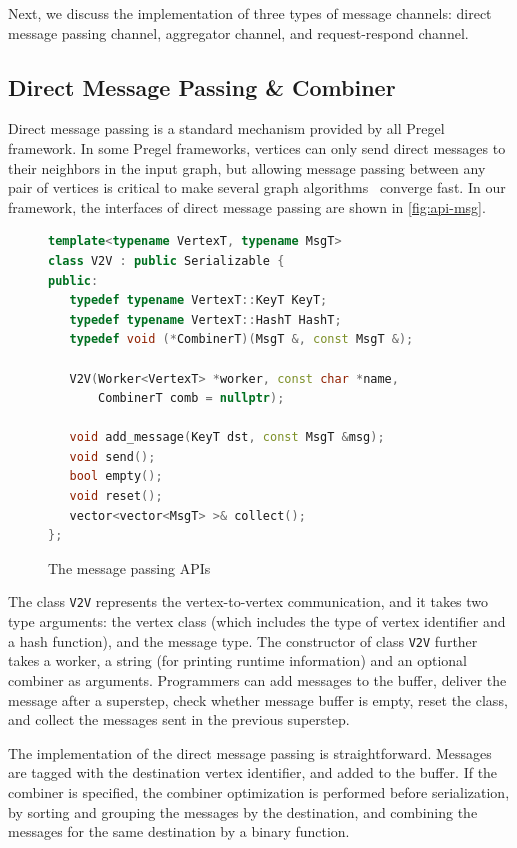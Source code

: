 \documentclass{sokendai_thesis} %
\begin{document}
Next, we discuss the implementation of three types of message channels: direct message passing channel, aggregator channel, and request-respond channel.

\subsection{Direct Message Passing \& Combiner}

Direct message passing is a standard mechanism provided by all Pregel framework.
In some Pregel frameworks, vertices can only send direct messages to their neighbors in the input graph, but allowing message passing between any pair of vertices is critical to make several graph algorithms~\cite{connectivity, effective} converge fast.
In our framework, the interfaces of direct message passing are shown in \autoref{fig:api-msg}.

\begin{figure}[ht]
\centering
\vspace{-2ex}
\begin{lstlisting}[basicstyle=\small\ttfamily,
numbers=none,language=c++,xleftmargin=0.1\textwidth]
template<typename VertexT, typename MsgT>
class V2V : public Serializable {
public:
   typedef typename VertexT::KeyT KeyT;
   typedef typename VertexT::HashT HashT;
   typedef void (*CombinerT)(MsgT &, const MsgT &);

   V2V(Worker<VertexT> *worker, const char *name,
       CombinerT comb = nullptr);

   void add_message(KeyT dst, const MsgT &msg);
   void send();
   bool empty();
   void reset();
   vector<vector<MsgT> >& collect();
};
\end{lstlisting}
\vspace{-2ex}
\caption{The message passing APIs}
\label{fig:api-msg}
\end{figure}

The class \texttt{V2V} represents the vertex-to-vertex communication, and it takes two type arguments: the vertex class (which includes the type of vertex identifier and a hash function), and the message type.
The constructor of class \texttt{V2V} further takes a worker, a string (for printing runtime information) and an optional combiner as arguments.
Programmers can add messages to the buffer, deliver the message after a superstep, check whether message buffer is empty, reset the class, and collect the messages sent in the previous superstep.

The implementation of the direct message passing is straightforward.
Messages are tagged with the destination vertex identifier, and added to the buffer.
If the combiner is specified, the combiner optimization is performed before serialization, by sorting and grouping the messages by the destination, and combining the messages for the same destination by a binary function.
\end{document}
